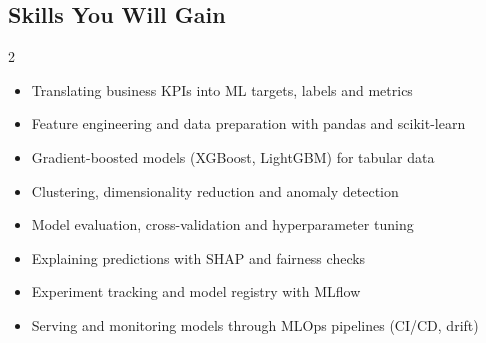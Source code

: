 \documentclass[10pt,a4paper]{article}
\begin{document}
\subsection*{Skills You Will Gain}\begin{multicols}{2}\begin{itemize}\small
\item Translating business KPIs into ML targets, labels and metrics
\item Feature engineering and data preparation with pandas and scikit-learn
\item Gradient-boosted models (XGBoost, LightGBM) for tabular data
\item Clustering, dimensionality reduction and anomaly detection
\item Model evaluation, cross-validation and hyperparameter tuning
\item Explaining predictions with SHAP and fairness checks
\item Experiment tracking and model registry with MLflow
\item Serving and monitoring models through MLOps pipelines (CI/CD, drift)
\end{itemize}\end{multicols}
\end{document}
